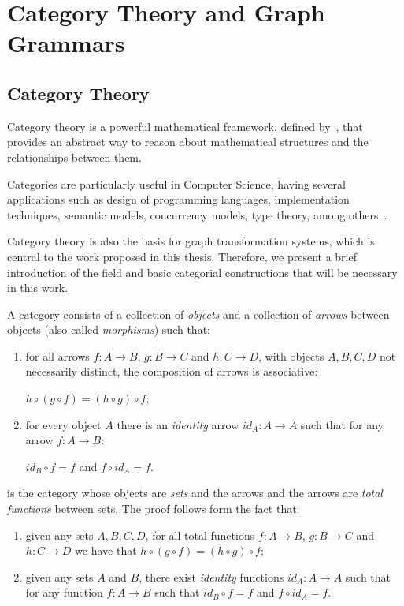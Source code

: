 \chapter{Category Theory and Graph Grammars}\label{ch:gts}

\section{Category Theory}

Category theory is a powerful mathematical framework, defined by~\cite{Eilenberg1945}, that provides an abstract way to reason about mathematical structures and the relationships between them.

Categories are particularly useful in Computer Science, having several applications such as design of programming languages, implementation techniques, semantic models, concurrency models, type theory, among others~\cite{Pierce1991}.

Category theory is also the basis for graph transformation systems, which is central to the work proposed in this thesis. Therefore, we present a brief introduction of the field and basic categorial constructions that will be necessary in this work.

\begin{definition}[Category]\label{def:category} A category  consists of a collection of \emph{objects} and a collection of \emph{arrows} between objects (also called \emph{morphisms}) such that:

  \begin{enumerate}
    \item for all arrows $f : A \rightarrow B$, $g : B \rightarrow C$ and
$h : C \rightarrow D$, with objects $A,B,C,D$ not necessarily distinct, the composition of arrows is associative:

  $h \circ (g \circ f) = (h \circ g) \circ f$;
    \item for every object $A$ there is an \emph{identity} arrow $id_A : A \rightarrow A$ such that for any arrow $f : A \rightarrow B$:

  $id_B \circ f = f$ and $f \circ id_A = f$.
  \end{enumerate}
\end{definition}

\begin{example}  is the category whose objects are \emph{sets} and the arrows and the arrows are \emph{total functions} between sets. The proof follows form the fact that:

\begin{enumerate}
  \item given any sets $A,B,C,D$, for all total functions $f : A \rightarrow B$, $g : B \rightarrow C$ and $h : C \rightarrow D$ we have that $h \circ (g \circ f) = (h \circ g) \circ f$;

  \item given any sets $A$ and $B$, there exist \emph{identity} functions $id_A : A \rightarrow A$ such that for any function $f : A \rightarrow B$ such that $id_B \circ f = f$ and $f \circ id_A = f$.
\end{enumerate}
\end{example}

